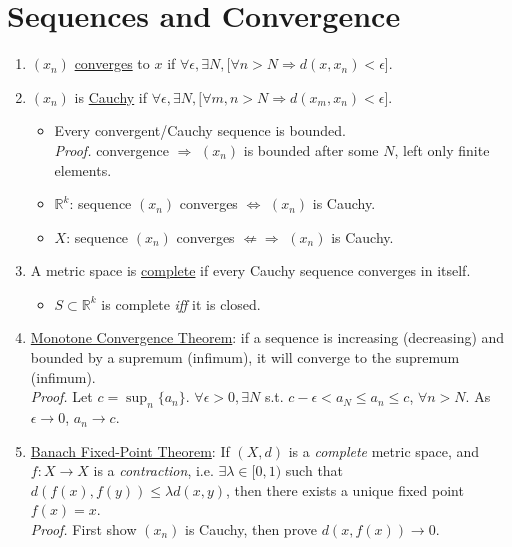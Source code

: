 \documentclass[%
 aip,
 jmp,%
 amsmath,amssymb,
 reprint,%
]{revtex4-1}
\def\R{{\mathbb R}}
\def\e{\epsilon}
\renewenvironment{proof}{\color{gray}\footnotesize\emph{Proof.}}{}
\newcommand{\imply}{\Rightarrow}
\renewcommand{\iff}{\Leftrightarrow}
\newcommand{\defn}[1]{\underline{#1}}
\begin{document}
\section{Sequences and Convergence}
\begin{enumerate}

\item $(x_n)$ \defn{converges} to $x$ if $\forall \e, \exists N, [\forall n>N \imply d(x,x_n) < \e$].

\item $(x_n)$ is \defn{Cauchy} if $\forall \e, \exists N, [\forall m,n>N \imply d(x_m,x_n) < \e$].

  \begin{itemize}
    \item Every convergent/Cauchy sequence is bounded.\\
      \begin{proof}
        convergence $\imply$ $(x_n)$ is bounded after some $N$, left only finite elements.
      \end{proof}
    \item $\R^k$: sequence $(x_n)$ converges $\iff$ $(x_n)$ is Cauchy.
    \item $X$: sequence $(x_n)$ converges $\not\Leftarrow\Rightarrow$ $(x_n)$ is Cauchy.
  \end{itemize}

\item A metric space is \defn{complete} if every Cauchy sequence converges in itself.
    \begin{itemize}
      \item $S \subset \R^k$ is complete \emph{iff} it is closed.
    \end{itemize}

\item \defn{Monotone Convergence Theorem}:
if a sequence is increasing (decreasing) and bounded
by a supremum (infimum), it will converge to the supremum (infimum).\\
    \begin{proof}
      Let $c = \sup_{n} \{a_n\}$. $\forall \e>0, \exists N$ s.t.
      $c-\e < a_N \leq a_n \leq c$, $\forall n>N$. As $\e \to 0$, $a_n \to c$.
    \end{proof}

\item \defn{Banach Fixed-Point Theorem}:
If $(X,d)$ is a \emph{complete} metric space, and $f: X \to X$ is a \emph{contraction},
i.e. $\exists \lambda \in [0,1)$ such that $d(f(x), f(y)) \leq \lambda d(x,y)$,
then there exists a unique fixed point $f(x)=x$. \\
    \begin{proof}
      First show $(x_n)$ is Cauchy, then prove $d(x, f(x)) \to 0$.
    \end{proof}
\end{enumerate}
\end{document}
